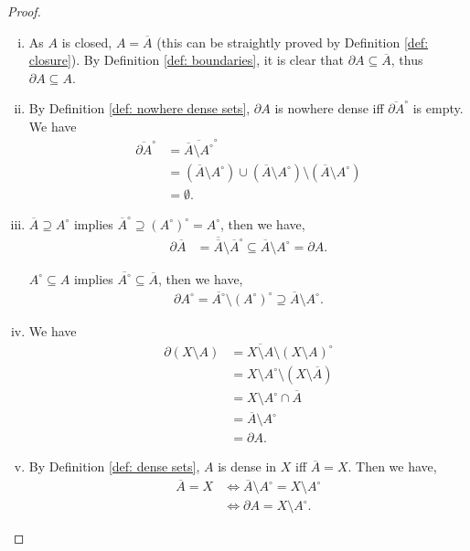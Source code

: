 \begin{proposition}
\begin{proof}
\begin{enumerate}[(i)]
			\item As $A$ is closed, $A = \overline A$ (this can be straightly proved by Definition \ref{def: closure}). By Definition \ref{def: boundaries}, it is clear that $\partial A \subseteq \overline A$, thus $\partial A \subseteq A$.
			
			\item
			By Definition \ref{def: nowhere dense sets}, $\partial A$ is nowhere dense iff $\overline{\partial A}^\circ$ is empty. We have
			$$
			\begin{aligned}
				\overline{\partial A}^\circ &= \overline{\overline A \setminus A^\circ}^\circ \\
				&= (\overline A \setminus A^\circ) \cup (\overline A \setminus A^\circ) \setminus (\overline A \setminus A^\circ) \\
				&= \emptyset.
			\end{aligned}			
			$$
			
			\item
			$\overline A \supseteq A^\circ$ implies $\overline A^\circ \supseteq (A^\circ)^\circ = A^\circ$, then we have,
			$$
			\begin{aligned}
				\partial \overline A &= \overline{\overline A} \setminus  \overline A^\circ \subseteq \overline A \setminus A^\circ = \partial A.
			\end{aligned}
			$$
			
			$A^\circ \subseteq A$ implies $ \overline{A^\circ} \subseteq \overline A$, then we have,
			$$
			\begin{aligned}
				\partial A^\circ = \overline{A^\circ} \setminus (A^\circ)^\circ \supseteq \overline A \setminus A^\circ.
			\end{aligned}
			$$
			
			\item
			We have
			$$
			\begin{aligned}
				\partial (X \setminus A) &= \overline{X \setminus A} \setminus (X \setminus A)^\circ \\
				&= X \setminus A^\circ \setminus (X \setminus \overline A) \\
				&= X \setminus A^\circ \cap \overline A \\
				&= \overline A \setminus A^\circ \\
				&= \partial A.
			\end{aligned}
			$$
			
			\item
			By Definition \ref{def: dense sets}, $A$ is dense  in $X$ iff $\overline A = X$. Then we have,
			$$
			\begin{aligned}
				\overline A = X &\iff \overline A \setminus A^\circ = X \setminus A^\circ \\
				&\iff \partial A = X \setminus A^\circ.
			\end{aligned}
			$$
		\end{enumerate}
	\end{proof}
\end{proposition}


